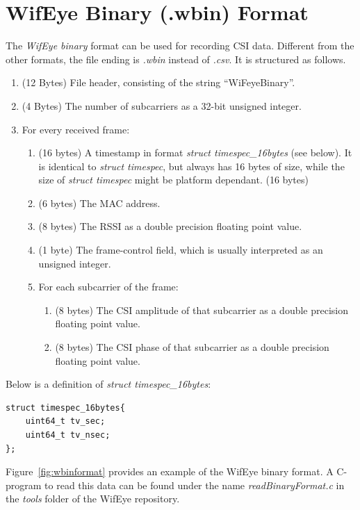 \documentclass{article}
\begin{document}
\section{WifEye Binary (.wbin) Format}
The \textit{WifEye binary} format can be used for recording CSI data. Different from the other formats, the file ending is \textit{.wbin} instead of \textit{.csv}.
It is structured as follows.
\begin{enumerate}
	\item (12 Bytes) File header, consisting of the string ``WiFeyeBinary''.
	\item (4 Bytes) The number of subcarriers as a 32-bit unsigned integer.
	\item For every received frame:
	\begin{enumerate}
		\item (16 bytes) A timestamp in format \textit{struct timespec\_16bytes} (see below). It is identical to \textit{struct timespec}, but always has 16 bytes of size, while the size of \textit{struct timespec} might be platform dependant. (16 bytes)
		\item (6 bytes) The MAC address.
		\item (8 bytes) The RSSI as a double precision floating point value.
		\item (1 byte) The frame-control field, which is usually interpreted as an unsigned integer.
		\item For each subcarrier of the frame:
		\begin{enumerate}
			\item (8 bytes) The CSI amplitude of that subcarrier as a double precision floating point value.
			\item (8 bytes) The CSI phase of that subcarrier as a double precision floating point value.
		\end{enumerate}
	\end{enumerate}
\end{enumerate}
Below is a definition of \textit{struct timespec\_16bytes}:
\begin{verbatim}
struct timespec_16bytes{
	uint64_t tv_sec;
	uint64_t tv_nsec;
};
\end{verbatim}
Figure~\ref{fig:wbinformat} provides an example of the WifEye binary format.
A C-program to read this data can be found under the name \textit{readBinaryFormat.c} in the \textit{tools} folder of the WifEye repository.
\end{document}
